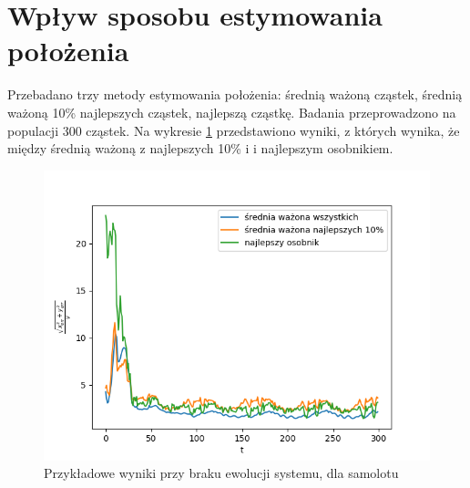 
\section{Wpływ sposobu estymowania położenia}
Przebadano trzy metody estymowania położenia: średnią ważoną cząstek, średnią ważoną 10\% najlepszych cząstek, najlepszą cząstkę. Badania przeprowadzono na populacji 300 cząstek. Na wykresie \ref{wplyw_est} przedstawiono wyniki, z których wynika, że między średnią ważoną z najlepszych 10\% i i najlepszym osobnikiem.

\begin{figure}[H]
	\begin{center}
		\includegraphics[width=12cm]{./wplyw_est.png}
		\caption{Przykładowe wyniki przy braku ewolucji systemu, dla samolotu}
		\label{wplyw_est}
	\end{center}
\end{figure}


